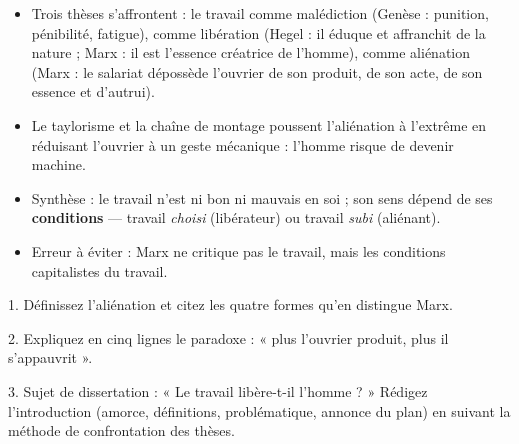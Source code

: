 \documentclass[11pt]{article}
\newcommand{\cle}[1]{{\popxbold\color{popdark}#1}}
\begin{document}
\begin{aretenir}
\begin{itemize}
\item Trois thèses s'affrontent : le travail comme \cle{malédiction} (Genèse : punition, pénibilité, fatigue), comme \cle{libération} (Hegel : il éduque et affranchit de la nature ; Marx : il est l'essence créatrice de l'homme), comme \cle{aliénation} (Marx : le salariat dépossède l'ouvrier de son produit, de son acte, de son essence et d'autrui).
\item Le \cle{taylorisme} et la chaîne de montage poussent l'aliénation à l'extrême en réduisant l'ouvrier à un geste mécanique : l'homme risque de devenir machine.
\item Synthèse : le travail n'est ni bon ni mauvais en soi ; son sens dépend de ses \textbf{conditions} — travail \emph{choisi} (libérateur) ou travail \emph{subi} (aliénant).
\item Erreur à éviter : Marx ne critique pas le travail, mais les conditions capitalistes du travail.
\end{itemize}
\end{aretenir}

\begin{exercice}
1. Définissez l'aliénation et citez les quatre formes qu'en distingue Marx.\par
2. Expliquez en cinq lignes le paradoxe : « plus l'ouvrier produit, plus il s'appauvrit ».\par
3. Sujet de dissertation : « Le travail libère-t-il l'homme ? » Rédigez l'introduction (amorce, définitions, problématique, annonce du plan) en suivant la méthode de confrontation des thèses.
\end{exercice}
\end{document}
